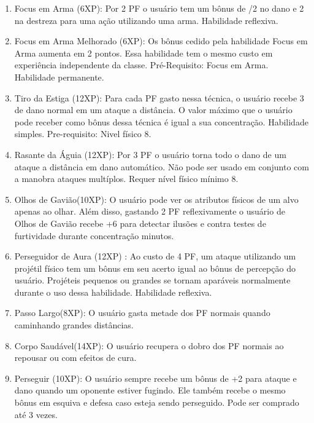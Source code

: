 \begin{enumerate}

	\item Focus em Arma (6XP): Por 2 PF o usuário tem um bônus de /2 no dano e 2 na destreza para uma ação utilizando uma arma. Habilidade reflexiva.

	\item Focus em Arma Melhorado (6XP): Os bônus cedido pela habilidade Focus em Arma aumenta em 2 pontos. Essa habilidade tem o mesmo custo em experiência independente da classe. Pré-Requisito: Focus em Arma. Habilidade permanente.

	\item Tiro da Estiga (12XP): Para cada PF gasto nessa técnica, o usuário recebe 3 de dano normal em um ataque a distância. O valor máximo que o usuário pode receber como bônus dessa técnica é igual a sua concentração. Habilidade simples.  Pre-requisito: Nivel físico 8.

	\item Rasante da Águia (12XP): Por 3 PF o usuário torna todo o dano de um ataque a distância em dano automático. Não pode ser usado em conjunto com a manobra ataques multíplos. Requer nível físico mínimo 8. 
	
	\item Olhos de Gavião(10XP): O usuário pode ver os atributos físicos de um alvo apenas ao olhar. Além disso, gastando 2 PF reflexivamente o usuário de Olhos de Gavião recebe +6 para detectar ilusões e contra testes de furtividade durante concentração minutos.
	
	\item Perseguidor de Aura (12XP) : Ao custo de 4 PF, um ataque utilizando um projétil físico tem um bônus em seu acerto igual ao bônus de percepção do usuário. Projéteis pequenos ou grandes se tornam aparáveis normalmente durante o uso dessa habilidade. Habilidade reflexiva.

	\item Passo Largo(8XP): O usuário gasta metade dos PF normais quando caminhando grandes distâncias.

	\item Corpo Saudável(14XP): O usuário recupera o dobro dos PF normais ao repousar ou com efeitos de cura.
	
	\item Perseguir (10XP): O usuário sempre recebe um bônus de +2 para ataque e dano quando um oponente estiver fugindo. Ele também recebe o mesmo bônus em esquiva e defesa caso esteja sendo perseguido. Pode ser comprado até 3 vezes.


\end{enumerate}
